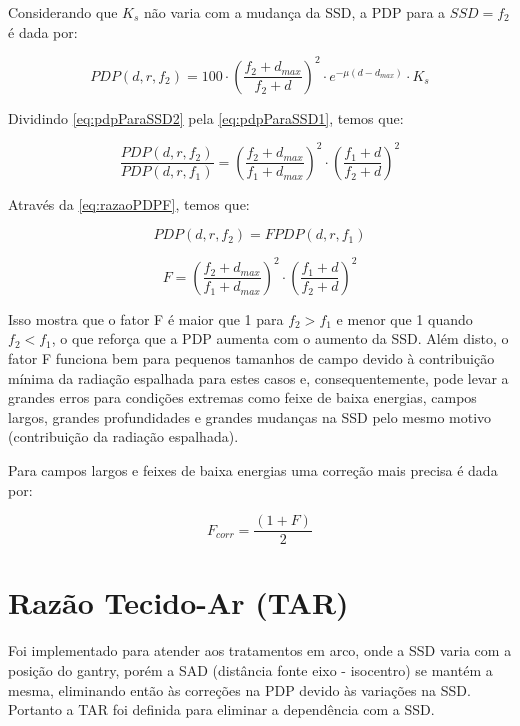 \documentclass[11pt,a4paper]{article}
\newcounter{exemplo}
\begin{document}
	Considerando que $K_s$ não varia com a mudança da SSD, a PDP para a $SSD = f_2$ é dada por:

	\begin{equation}
		PDP(d, r, f_2) = 100 \cdot \left(\frac{f_2 + d_{max}}{f_2 + d}\right)^2 \cdot e^{-\mu (d - d_{max})} \cdot K_s
		\label{eq:pdpParaSSD2}
	\end{equation}

	Dividindo \ref{eq:pdpParaSSD2} pela \ref{eq:pdpParaSSD1}, temos que:

	\begin{equation}
		\frac{PDP(d, r, f_2)}{PDP(d, r, f_1)} = \left(\frac{f_2 + d_{max}}{f_1 + d_{max}}\right)^2 \cdot \left(\frac{f_1 + d}{f_2 + d}\right)^2
		\label{eq:razaoPDPF}
	\end{equation}

	Através da \ref{eq:razaoPDPF}, temos que:

		$$PDP(d, r, f_2) = F PDP(d, r, f_1)$$

	\begin{exemplo}
		\begin{equation}
			F = \left(\frac{f_2 + d_{max}}{f_1 + d_{max}}\right)^2 \cdot \left(\frac{f_1 + d}{f_2 + d}\right)^2
			\label{eq:fatorF}
		\end{equation}
	\end{exemplo}


	Isso mostra que o fator F é maior que 1 para $f_2 > f_1$ e menor que 1 quando $f_2 < f_1$, o que reforça que a PDP aumenta com o aumento da SSD. Além disto, o fator F funciona bem para pequenos tamanhos de campo devido à contribuição mínima da radiação espalhada para estes casos e, consequentemente, pode levar a grandes erros para condições extremas como feixe de baixa energias, campos largos, grandes profundidades e grandes mudanças na SSD pelo mesmo motivo (contribuição da radiação espalhada). 

	Para campos largos e feixes de baixa energias uma correção mais precisa é dada por:

		\begin{equation}
			F_{corr} = \frac{(1 + F)}{2}
		\end{equation}

	\section{Razão Tecido-Ar (TAR)}

	Foi implementado para atender aos tratamentos em arco, onde a SSD varia com a posição do gantry, porém a SAD (distância fonte eixo - isocentro) se mantém a mesma, eliminando então às correções na PDP devido às variações na SSD. Portanto a TAR foi definida para eliminar a dependência com a SSD. 
\end{document}
